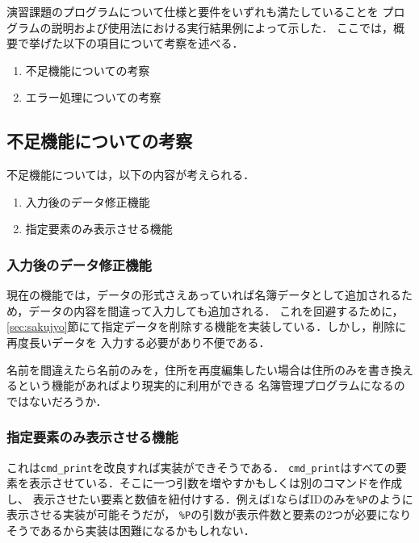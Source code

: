 \documentclass[a4j,11pt]{jarticle}
\begin{document}
演習課題のプログラムについて仕様と要件をいずれも満たしていることを
プログラムの説明および使用法における実行結果例によって示した．
ここでは，概要で挙げた以下の項目について考察を述べる．

\begin{enumerate}
\setlength{\parskip}{2pt} \setlength{\itemsep}{2pt}
    \item 不足機能についての考察
    \item エラー処理についての考察
\end{enumerate}

\subsection{不足機能についての考察}\label{sec:husoku}
不足機能については，以下の内容が考えられる．
\begin{enumerate}
\setlength{\parskip}{2pt} \setlength{\itemsep}{2pt}
   \item 入力後のデータ修正機能
   \item 指定要素のみ表示させる機能
\end{enumerate}
\subsubsection{入力後のデータ修正機能}
現在の機能では，データの形式さえあっていれば名簿データとして追加されるため，データの内容を間違って入力しても追加される．
これを回避するために，\ref{sec:sakujyo}節にて指定データを削除する機能を実装している．しかし，削除に再度長いデータを
入力する必要があり不便である．

名前を間違えたら名前のみを，住所を再度編集したい場合は住所のみを書き換えるという機能があればより現実的に利用ができる
名簿管理プログラムになるのではないだろうか．
\subsubsection{指定要素のみ表示させる機能}
これは\verb|cmd_print|を改良すれば実装ができそうである．
\verb|cmd_print|はすべての要素を表示させている．そこに一つ引数を増やすかもしくは別のコマンドを作成し、
表示させたい要素と数値を紐付けする．例えば$1$ならばIDのみを\verb|%P|のように表示させる実装が可能そうだが，
\verb|%P|の引数が表示件数と要素の2つが必要になりそうであるから実装は困難になるかもしれない．
\end{document}
